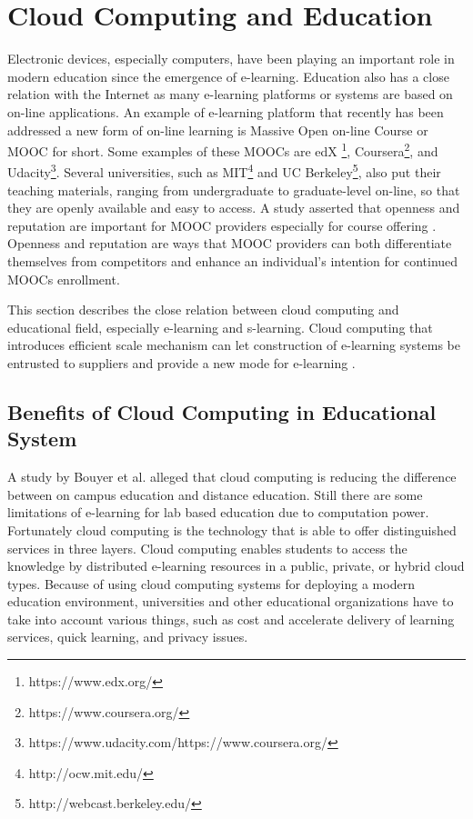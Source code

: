 \documentclass[journal]{vgtc}
\begin{document}
\section{Cloud Computing and Education}
Electronic devices, especially computers, have been playing an important role in modern education since the emergence of e-learning. Education also has a close relation with the Internet as many e-learning platforms or systems are based on on-line applications. An example of e-learning platform that recently has been addressed a new form of on-line learning is Massive Open on-line Course or MOOC for short\cite{Margaryan2014}. Some examples of these MOOCs are edX \footnote{https://www.edx.org/}, Coursera\footnote{https://www.coursera.org/}, and Udacity\footnote{https://www.udacity.com/https://www.coursera.org/}. Several universities, such as MIT\footnote{http://ocw.mit.edu/} and UC Berkeley\footnote{http://webcast.berkeley.edu/}, also put their teaching materials, ranging from undergraduate to graduate-level on-line, so that they are openly available and easy to access. A study asserted that openness and reputation are important for MOOC providers especially for course offering \cite{Alraimi2014}. Openness and reputation are ways that MOOC providers can both differentiate themselves from competitors and enhance an individual's intention for continued MOOCs enrollment.

This section describes the close relation between cloud computing and educational field, especially e-learning and s-learning. Cloud computing that introduces efficient scale mechanism can let construction of e-learning systems be entrusted to suppliers and provide a new mode for e-learning \cite{Laisheng2011}.

  \subsection{Benefits of Cloud Computing in Educational System}
  A study by Bouyer et al. \cite{Bouyer2014} alleged that cloud computing is reducing the difference between on campus education and distance education. Still there are some limitations of e-learning for lab based education due to computation power. Fortunately cloud computing is the technology that is able to offer distinguished services in three layers. Cloud computing enables students to access the knowledge by distributed e-learning resources in a public, private, or hybrid cloud types. Because of using cloud computing systems for deploying a modern education environment, universities and other educational organizations have to take into account various things, such as cost and accelerate delivery of learning services, quick learning, and privacy issues.
\end{document}
